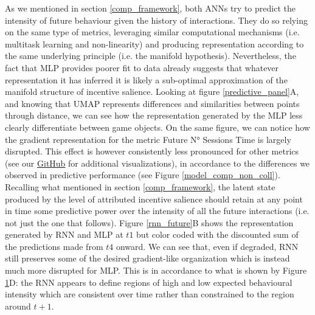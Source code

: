\begin{figure}[ht]
\label{full_panel_temporal}
\end{figure}

As we mentioned in section \ref{comp_framework}, both ANNs try to predict the intensity of future behaviour given the history of interactions. They do so relying on the same type of metrics, leveraging similar computational mechanisms (i.e. multitask learning and non-linearity) and producing representation according to the same underlying principle (i.e. the manifold hypothesis). Nevertheless, the fact that MLP provides poorer fit to data already suggests that whatever representation it has inferred it is likely a sub-optimal approximation of the manifold structure of incentive salience. Looking at figure \ref{predictive_panel}A, and knowing that UMAP represents differences and similarities between points through distance, we can see how the representation generated by the MLP less clearly differentiate between game objects. On the same figure, we can notice how the gradient representation for the metric Future N° Sessions Time is largely disrupted. This effect is however consistently less pronounced for other metrics (see our \href{https://htmlpreview.github.io/?https://github.com/vb690/approx_incentive_salience/blob/main/notebooks_html/embedding_analysis.html}{GitHub} for additional visualizations), in accordance to the differences we observed in predictive performance (see Figure \ref{model_comp_non_coll}). Recalling what mentioned in section \ref{comp_framework}, the latent state produced by the level of attributed incentive salience should retain at any point in time some predictive power over the intensity of all the future interactions (i.e. not just the one that follows). Figure \ref{rnn_future}B shows the representation generated by RNN and MLP at $t1$ but color coded with the discounted sum of the predictions made from $t4$ onward. We can see that, even if degraded, RNN still preserves some of the desired gradient-like organization which is instead much more disrupted for MLP. This is in accordance to what is shown by Figure \ref{full_panel_temporal}D: the RNN appears to define regions of high and low expected behavioural intensity which are consistent over time rather than constrained to the region around $t+1$.
